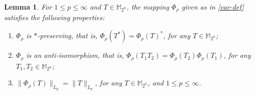 \documentclass{amsbook}
\newtheorem{lemma}[theorem]{Lemma}
\theoremstyle{definition}
\theoremstyle{remark}
\numberwithin{section}{chapter}
\numberwithin{equation}{chapter}
\newcommand{\1}{\mathbf{1}}
\begin{document}
\begin{lemma}\label{var-prop}
For $1 \leq p \leq \infty$ and $T \in \mathbb{M}_{2^n}$, the mapping $\varPhi_\rho$  given as in \eqref{var-def} satisfies the following properties:
\begin{enumerate}[{\rm (i)}]
\item $\varPhi_\rho$ is $*$-preserving, that is, $\varPhi_\rho(T^*)=\varPhi_\rho(T)^*$, for any $T\in\mathbb{M}_{2^n}$;
\item $\varPhi_\rho$ is an anti-isomorphism, that is, $\varPhi_\rho(T_1T_2)=\varPhi_\rho(T_2)\varPhi_\rho(T_1)$, for any $T_1,T_2\in\mathbb{M}_{2^n}$;
\item $\|\varPhi_\rho(T)\|_{L_{p}}=\|T\|_{L_{p}}$, for any $T\in\mathbb{M}_{2^n}$, and $1 \leq p \leq \infty$.
\end{enumerate}
\end{lemma}
\end{document}
